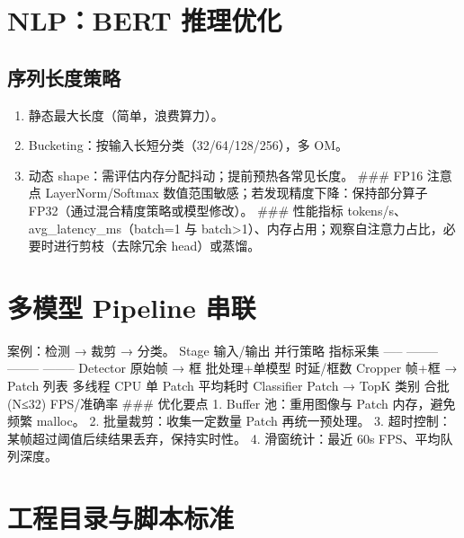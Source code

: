 \section{NLP：BERT 推理优化}\label{nlpbert-ux63a8ux7406ux4f18ux5316}

\subsection{序列长度策略}\label{ux5e8fux5217ux957fux5ea6ux7b56ux7565}

\begin{enumerate}
\def\labelenumi{\arabic{enumi}.}
\tightlist
\item
  静态最大长度（简单，浪费算力）。
\item
  Bucketing：按输入长短分类（32/64/128/256），多 OM。
\item
  动态 shape：需评估内存分配抖动；提前预热各常见长度。 \#\#\# FP16
  注意点 LayerNorm/Softmax 数值范围敏感；若发现精度下降：保持部分算子
  FP32（通过混合精度策略或模型修改）。 \#\#\# 性能指标
  tokens/s、avg\_latency\_ms（batch=1 与
  batch\textgreater1）、内存占用；观察自注意力占比，必要时进行剪枝（去除冗余
  head）或蒸馏。
\end{enumerate}

\section{多模型 Pipeline
串联}\label{ux591aux6a21ux578b-pipeline-ux4e32ux8054}

案例：检测 → 裁剪 → 分类。 \textbar{} Stage \textbar{} 输入/输出
\textbar{} 并行策略 \textbar{} 指标采集 \textbar{} \textbar{} -----
\textbar{} -------- \textbar{} -------- \textbar{} -------- \textbar{}
\textbar{} Detector \textbar{} 原始帧 → 框 \textbar{} 批处理+单模型
\textbar{} 时延/框数 \textbar{} \textbar{} Cropper \textbar{} 帧+框 →
Patch 列表 \textbar{} 多线程 CPU \textbar{} 单 Patch 平均耗时 \textbar{}
\textbar{} Classifier \textbar{} Patch → TopK 类别 \textbar{} 合批
(N≤32) \textbar{} FPS/准确率 \textbar{} \#\#\# 优化要点 1. Buffer
池：重用图像与 Patch 内存，避免频繁 malloc。 2. 批量裁剪：收集一定数量
Patch 再统一预处理。 3. 超时控制：某帧超过阈值后续结果丢弃，保持实时性。
4. 滑窗统计：最近 60s FPS、平均队列深度。

\section{工程目录与脚本标准}\label{ux5de5ux7a0bux76eeux5f55ux4e0eux811aux672cux6807ux51c6}


